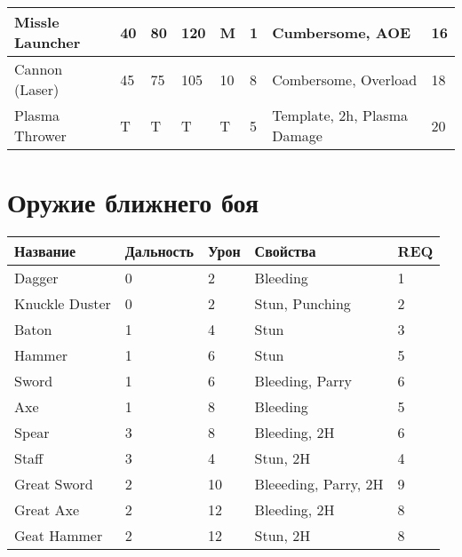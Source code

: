 \begin{table}[H]
\begin{tabular}{|l|l|l|l|l|l|l|l|}
        Missle Launcher       & 40                                                      & 80                                                      & 120                                                     & M    & 1   & Cumbersome, AOE                   & 16  \\ \hline
        Cannon (Laser)        & 45                                                      & 75                                                      & 105                                                     & 10   & 8   & Combersome, Overload              & 18  \\ \hline
        Plasma Thrower        & T                                                       & T                                                       & T                                                       & T    & 5   & Template, 2h, Plasma Damage       & 20  \\ \hline
        \end{tabular}
        \end{table}

    \section*{Оружие ближнего боя}

\begin{table}[H]
\centering
\begin{tabular}{|l|l|l|l|l|}
\hline
Название       & Дальность & Урон & Свойства             & REQ \\ \hline
Dagger         & 0         & 2    & Bleeding             & 1   \\ \hline
Knuckle Duster & 0         & 2    & Stun, Punching       & 2   \\ \hline
Baton          & 1         & 4    & Stun                 & 3   \\ \hline
Hammer         & 1         & 6    & Stun                 & 5   \\ \hline
Sword          & 1         & 6    & Bleeding, Parry      & 6   \\ \hline
Axe            & 1         & 8    & Bleeding             & 5   \\ \hline
Spear          & 3         & 8    & Bleeding, 2H         & 6   \\ \hline
Staff          & 3         & 4    & Stun, 2H             & 4   \\ \hline
Great Sword    & 2         & 10   & Bleeeding, Parry, 2H & 9   \\ \hline
Great Axe      & 2         & 12   & Bleeding, 2H         & 8   \\ \hline
Geat Hammer    & 2         & 12   & Stun, 2H             & 8   \\ \hline
\end{tabular}
\end{table}